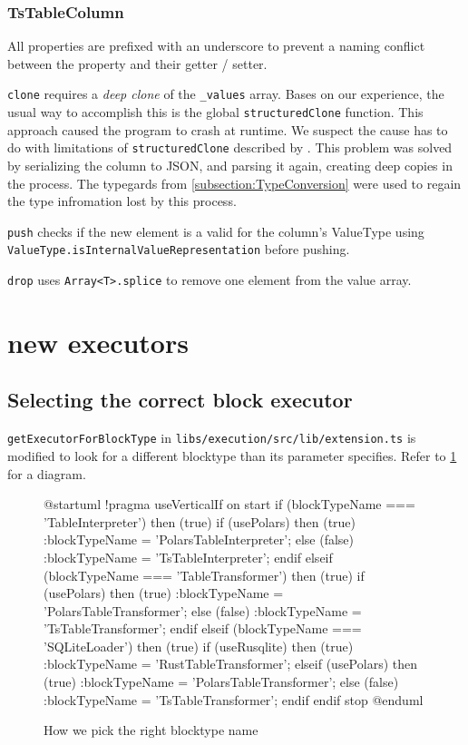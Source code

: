 \subsubsection{TsTableColumn}
All properties are prefixed with an underscore to prevent a naming conflict between the property and their getter / setter.

\Verb|clone| requires a \emph{deep clone} of the \Verb|_values| array.
Bases on our experience, the usual way to accomplish this is the global \Verb|structuredClone| function.
This approach caused the program to crash at runtime.
We suspect the cause has to do with limitations of \Verb|structuredClone| described by \textcite{js:docs:structuredClone}.
This problem was solved by serializing the column to \ac{JSON}, and parsing it again, creating deep copies in the process.
The typegards from \ref{subsection:TypeConversion} were used to regain the type infromation lost by this process.

\Verb|push| checks if the new element is a valid for the column's ValueType using \Verb|ValueType.isInternalValueRepresentation| before pushing.

\Verb|drop| uses \Verb|Array<T>.splice| to remove one element from the value array.


\section{new executors} %
\subsection{Selecting the correct block executor} %
\label{subsection:createBlockExecutor}
\Verb|getExecutorForBlockType| in \Verb|libs/execution/src/lib/extension.ts| is modified to look for a different blocktype than its parameter specifies.
Refer to \ref{fig:uml:getExecutorForBlockType} for a diagram. %
\begin{figure}
	\begin{plantuml}
		@startuml
		!pragma useVerticalIf on
		start
		if (blockTypeName === 'TableInterpreter') then (true)
		if (usePolars) then (true)
		:blockTypeName = 'PolarsTableInterpreter';
		else (false)
		:blockTypeName = 'TsTableInterpreter';
		endif
		elseif (blockTypeName === 'TableTransformer') then (true)
		if (usePolars) then (true)
		:blockTypeName = 'PolarsTableTransformer';
		else (false)
		:blockTypeName = 'TsTableTransformer';
		endif
		elseif (blockTypeName === 'SQLiteLoader') then (true)
		if (useRusqlite) then (true)
		:blockTypeName = 'RustTableTransformer';
		elseif (usePolars) then (true)
		:blockTypeName = 'PolarsTableTransformer';
		else (false)
		:blockTypeName = 'TsTableTransformer';
		endif
		endif
		stop
		@enduml
	\end{plantuml}
	\caption{How we pick the right blocktype name}
	\label{fig:uml:getExecutorForBlockType}
\end{figure}


